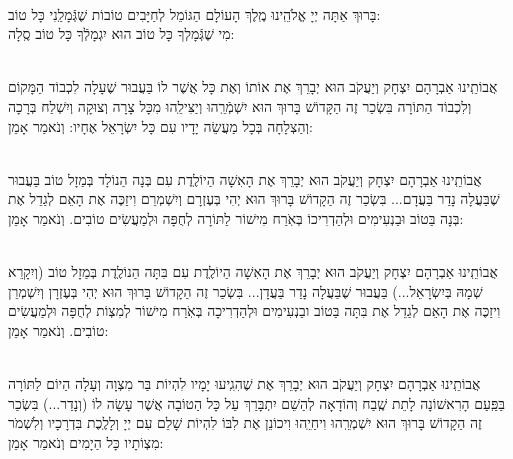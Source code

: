 \documentclass[twoside, openany, parskip=half, 11pt]{book}
\begin{document}
\newcommand{\hagomel}{
\instruction{ברכת הגומל}\\
 בָּרוּךְ אַתָּה יְיָ אֱלֹהֵֽינוּ מֶֽלֶךְ הָעוֹלָם הַגּוֹמֵל לְחַיָּבִים טוֹבוֹת שֶׁגְּֿמָלַֽנִי כָּל טוֹב:\\
\kahal
מִי שֶׁגְּֿמָלְךָ כָּל טוֹב הוּא יִגְמָלְֿךָ כָּל טוֹב סֶֽלָה:
}

\pesicha

\gadlu

\avharachamim

\vesigale

 \pageref{torah}

\torahbarachu %

\hagomel


\begin{sometimes}

\\
 אֲבוֹתֵֽינוּ אַבְרָהָם יִצְחָק וְיַעֲקֹב הוּא יְבָרֵךְ אֶת 
 אוֹתוֹ וְאֶת כָּל אֲשֶׁר לוֹ 
בַּעֲבוּר שֶׁעָלָה לִכְבוֹד הַמָּקוֹם וְלִכְבוֹד הַתּוֹרָה 
 בִּשְׂכַר זֶה הַקָּדוֹשׁ בָּרוּךְ הוּא יִשְׁמְֿרֵֽהוּ וְיַצִּילֵֽהוּ מִכָּל צָרָה וְצוּקָה 
וְיִשְׁלַח בְּרָכָה וְהַצְלָחָה בְּכָל מַעֲשֵׂה יָדָיו עִם כָּל יִשְׂרָאֵל אֶחָיו: וְנֹאמַר אָמֵן:



\\
אֲבוֹתֵֽינוּ אַבְרָהָם יִצְחָק וְיַעֲקֹב הוּא יְבָרֵךְ אֶת הָאִשָׁה הַיוֹלֶֽדֶת 
 עִם בְּנָה הַנוֹלָד בְּמַזָל טוֹב בַּעֲבוּר שֶׁבַּעֲלָה נָדַר בַּעֲדָם... בִּשְׂכַר זֶה הַקָדוֹשׁ בָּרוּךְ הוּא יְהִי בְּעֶזְרָם וְיִשְׁמְרֵם וִיזַכֶּה אֶת הָאֵם לְגַדֵל אֶת בְּנָה בַּטוֹב וּבַנְעִימִים וּלְהַדְרִיכוֹ בְּאֹֽרַח מִישׁוֹר לַתּוֹרָה לְחֻפָּה וּלְמַעֲשִׂים טוֹבִים. וְנֹאמַר אָמֵן:
 


\\
 אֲבוֹתֵֽינוּ אַבְרָהָם יִצְחָק וְיַעֲקֹב הוּא יְבָרֵךְ אֶת הָאִשָׁה הַיוֹלֶֽדֶת 
 עִם בִּתָּה הַנוֹלֶֽדֶת בְּמַזָל טוֹב (וְיִקָרֵא שְׁמָהּ בְּיִשְׂרָאֵל...) בַּעֲבוּר שֶׁבַּעֲלָה נָדַר בַּעֲדָן... בִּשְׂכַר זֶה הַקָדוֹשׁ בָּרוּךְ הוּא יְהִי בְּעֶזְרָן וְיִשְׁמְרֵן וִיזַכֶּה אֶת הָאֵם לְגַדֵל אֶת בִּתָּה בַּטוֹב ובַנְעִימִים וּלְהַדְרִיכָה בְּאֹֽרַח מִישׁוֹר לְמִצְוֹת לְחֻפָּה וּלְמַעֲשִׂים טוֹבִים. וְנֹאמַר אָמֵן:
 

\\
אֲבוֹתֵֽינוּ אַבְרָהָם יִצְחָק וְיַעֲקֹב הוּא יְבָרֵךְ אֶת 
 שֶׁהִגִֽיעוּ יָמָיו לִהְיוֹת בַּר מִצְוָה וְעָלָה הַיוֹם לַתּוֹרָה בַּפַּֽעַם הָרִאשׁוֹנָה לָתֵת שֶֽׁבַח וְהוֹדָאָה לְהַשֵׁם יִתְבָּרַךְ עַל כָּל הַטוֹבָה אֲשֶׁר עָשָׂה לוֹ (וְנָדַר...) בִּשְׂכַר זֶה הַקָדוֹשׁ בָּרוּךְ הוּא יִשְׁמְרֵֽהוּ וִיחַיֵֽהוּ וִיכוֹנֵן אֶת לִבּוֹ לִהְיוֹת שָׁלֵם עִם יְיָ וְלָלֶֽכֶת בִּדְרָכָיו וְלִשְׁמֹר מִצְוֹתָיו כָּל הַיָמִים וְנֹאמַר אָמֵן:
 
\end{sometimes}
\end{document}
